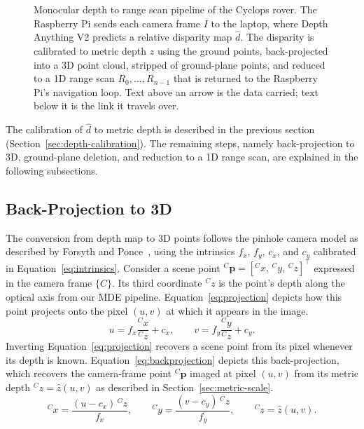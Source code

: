 \begin{figure}[htbp]
  \centering
  
  \caption[Monocular depth to range scan pipeline]{Monocular depth to range scan pipeline of the
    Cyclops rover. The Raspberry Pi sends each camera frame $I$ to the laptop, where Depth
    Anything V2 predicts a relative disparity map $\hat{d}$. The disparity is calibrated to
    metric depth $\hat{z}$ using the ground points, back-projected into a 3D point cloud, stripped
    of ground-plane points, and reduced to a 1D range scan
    $R_0, \dots, R_{n-1}$ that is returned to the Raspberry Pi's navigation loop. Text above an arrow is the
    data carried; text below it is the link it travels over.}
  \label{fig:mde-pipeline}
\end{figure}

The calibration of $\hat{d}$ to metric depth is described in the previous section
(Section~\ref{sec:depth-calibration}). The remaining steps, namely back-projection to 3D,
ground-plane deletion, and reduction to a 1D range scan, are explained in the following
subsections.


\subsection{Back-Projection to 3D}

The conversion from depth map to 3D points follows the pinhole camera model as described by
Forsyth and Ponce~\cite{Forsyth_Ponce_CV}, using the intrinsics $f_x$, $f_y$, $c_x$, and $c_y$ calibrated in
Equation~\ref{eq:intrinsics}. Consider a scene point
${}^{C}\mathbf{p} = [{}^{C}x,\, {}^{C}y,\, {}^{C}z]^\top$ expressed in the camera frame $\{C\}$.
Its third coordinate ${}^{C}z$ is the point's depth along the optical axis from our MDE pipeline. Equation~\ref{eq:projection} depicts how this point
projects onto the pixel $(u,v)$ at which it appears in the image.
\begin{equation}
  u = f_x \frac{{}^{C}x}{{}^{C}z} + c_x,
  \qquad
  v = f_y \frac{{}^{C}y}{{}^{C}z} + c_y.
  \label{eq:projection}
\end{equation}
Inverting Equation~\ref{eq:projection} recovers a scene point from its pixel whenever its depth
is known. Equation~\ref{eq:backprojection} depicts this back-projection, which recovers the
camera-frame point ${}^{C}\mathbf{p}$ imaged at pixel $(u,v)$ from its metric depth
${}^{C}z = \hat{z}(u,v)$ as described in Section~\ref{sec:metric-scale}.
\begin{equation}
  {}^{C}x = \frac{(u - c_x)\, {}^{C}z}{f_x},
  \qquad
  {}^{C}y = \frac{(v - c_y)\, {}^{C}z}{f_y},
  \qquad
  {}^{C}z = \hat{z}(u,v) .
  \label{eq:backprojection}
\end{equation}

